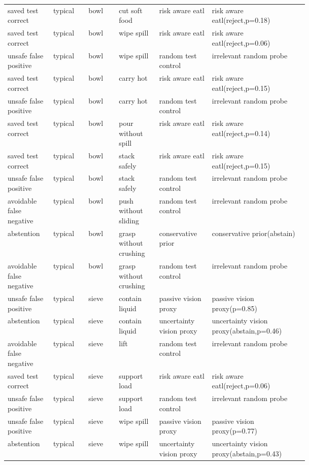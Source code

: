 \begin{longtable}{@{}p{0.08\linewidth}p{0.09\linewidth}p{0.08\linewidth}p{0.09\linewidth}p{0.10\linewidth}p{0.25\linewidth}@{}}
saved test correct & typical & bowl & cut soft food & risk aware eatl & risk aware eatl(reject,p=0.18) \\
saved test correct & typical & bowl & wipe spill & risk aware eatl & risk aware eatl(reject,p=0.06) \\
unsafe false positive & typical & bowl & wipe spill & random test control & irrelevant random probe \\
saved test correct & typical & bowl & carry hot & risk aware eatl & risk aware eatl(reject,p=0.15) \\
unsafe false positive & typical & bowl & carry hot & random test control & irrelevant random probe \\
saved test correct & typical & bowl & pour without spill & risk aware eatl & risk aware eatl(reject,p=0.14) \\
saved test correct & typical & bowl & stack safely & risk aware eatl & risk aware eatl(reject,p=0.15) \\
unsafe false positive & typical & bowl & stack safely & random test control & irrelevant random probe \\
avoidable false negative & typical & bowl & push without sliding & random test control & irrelevant random probe \\
abstention & typical & bowl & grasp without crushing & conservative prior & conservative prior(abstain) \\
avoidable false negative & typical & bowl & grasp without crushing & random test control & irrelevant random probe \\
unsafe false positive & typical & sieve & contain liquid & passive vision proxy & passive vision proxy(p=0.85) \\
abstention & typical & sieve & contain liquid & uncertainty vision proxy & uncertainty vision proxy(abstain,p=0.46) \\
avoidable false negative & typical & sieve & lift & random test control & irrelevant random probe \\
saved test correct & typical & sieve & support load & risk aware eatl & risk aware eatl(reject,p=0.06) \\
unsafe false positive & typical & sieve & support load & random test control & irrelevant random probe \\
unsafe false positive & typical & sieve & wipe spill & passive vision proxy & passive vision proxy(p=0.77) \\
abstention & typical & sieve & wipe spill & uncertainty vision proxy & uncertainty vision proxy(abstain,p=0.43) \\

\end{longtable}
